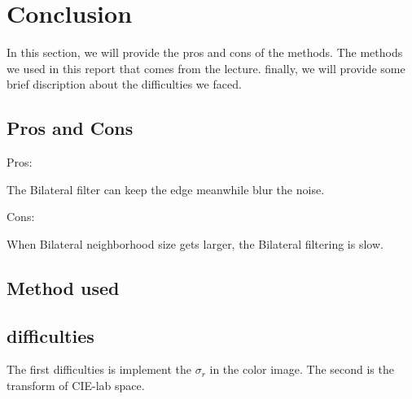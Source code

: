 \documentclass[12pt]{article}
\begin{document}



\section{Conclusion}
\label{section conclusion}
In this section, we will provide the pros and cons of the methods.
The methods we used in this report that comes from the lecture.
finally, we will provide some brief discription about the difficulties we faced.

\subsection{Pros and Cons}
Pros:

The Bilateral filter can keep the edge meanwhile blur the noise.  

Cons:

When Bilateral neighborhood size gets larger, the Bilateral filtering is slow. 
\subsection{Method used}


\subsection{difficulties}

The first difficulties is implement the $\sigma_r$ in the color image. 
The second is the transform of CIE-lab space. 
\end{document}
